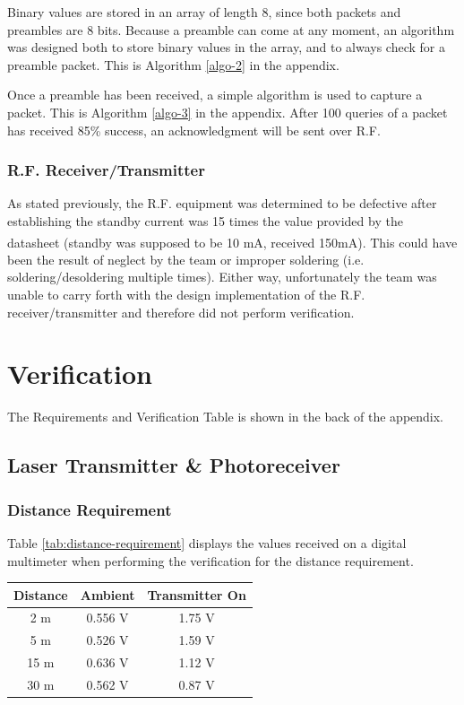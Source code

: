 \documentclass[letterpaper,10pt]{article}
\begin{document}
\begin{spacing}{1.15}
Binary values are stored in an array of length 8, since both packets and preambles are 8 bits. Because a preamble can come at any moment, an algorithm was designed both to store binary values in the array, and to always check for a preamble packet. This is Algorithm \ref{algo-2} in the appendix.

Once a preamble has been received, a simple algorithm is used to capture a packet. This is Algorithm \ref{algo-3} in the appendix. After 100 queries of a packet has received 85\% success, an acknowledgment will be sent over R.F.

\subsubsection{R.F. Receiver/Transmitter}
As stated previously, the R.F. equipment was determined to be defective after establishing the standby current was 15 times the value provided by the datasheet (standby was supposed to be 10 mA, received 150mA\textsuperscript{\cite{Linx-Transmitter}\cite{Linx-Receiver}}). This could have been the result of neglect by the team or improper soldering (i.e. soldering/desoldering multiple times). Either way, unfortunately the team was unable to carry forth with the design implementation of the R.F. receiver/transmitter and therefore did not perform verification.

\section{Verification}

The Requirements and Verification Table is shown in the back of the appendix.


\subsection{Laser Transmitter \& Photoreceiver}
\subsubsection{Distance Requirement}
Table \ref{tab:distance-requirement} displays the values received on a digital multimeter when performing the verification for the distance requirement. 
\begin{table}[htbp]
	\centering
	\begin{tabular}{c|c|c}	%
		\toprule	%
		Distance & Ambient & Transmitter On \\
		\midrule
		2 m  & 0.556 V & 1.75 V\\
		5 m & 0.526 V & 1.59 V\\
		15 m & 0.636 V & 1.12 V\\ 
		30 m & 0.562 V & 0.87 V\\
		

\end{tabular}
\end{table}
\end{spacing}
\end{document}
